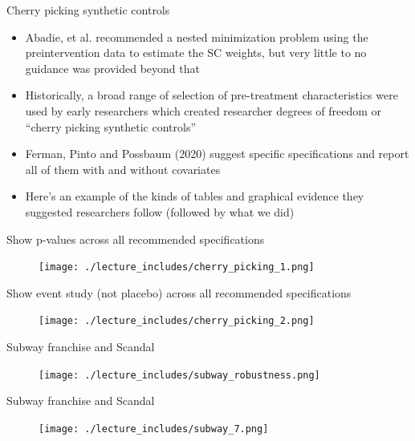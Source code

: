\documentclass{beamer}
\begin{document}
\begin{frame}{Cherry picking synthetic controls}

\begin{itemize}
\item Abadie, et al. recommended a nested minimization problem using the preintervention data to estimate the SC weights, but very little to no guidance was provided beyond that
\item Historically, a broad range of selection of pre-treatment characteristics were used by early researchers which created researcher degrees of freedom or ``cherry picking synthetic controls''
\item Ferman, Pinto and Possbaum (2020) suggest specific specifications and report all of them with and without covariates
\item Here's an example of the kinds of tables and graphical evidence they suggested researchers follow (followed by what we did)
\end{itemize}

\end{frame}


\begin{frame}{Show p-values across all recommended specifications}

	\begin{figure}
	\texttt{[image: ./lecture\_includes/cherry\_picking\_1.png]}
	\end{figure}

\end{frame}

\begin{frame}{Show event study (not placebo) across all recommended specifications}

	\begin{figure}
	\texttt{[image: ./lecture\_includes/cherry\_picking\_2.png]}
	\end{figure}

\end{frame}


\begin{frame}{Subway franchise and Scandal}

	\begin{figure}
	\texttt{[image: ./lecture\_includes/subway\_robustness.png]}
	\end{figure}

\end{frame}


\begin{frame}{Subway franchise and Scandal}

	\begin{figure}
	\texttt{[image: ./lecture\_includes/subway\_7.png]}
	\end{figure}

\end{frame}
\end{document}
